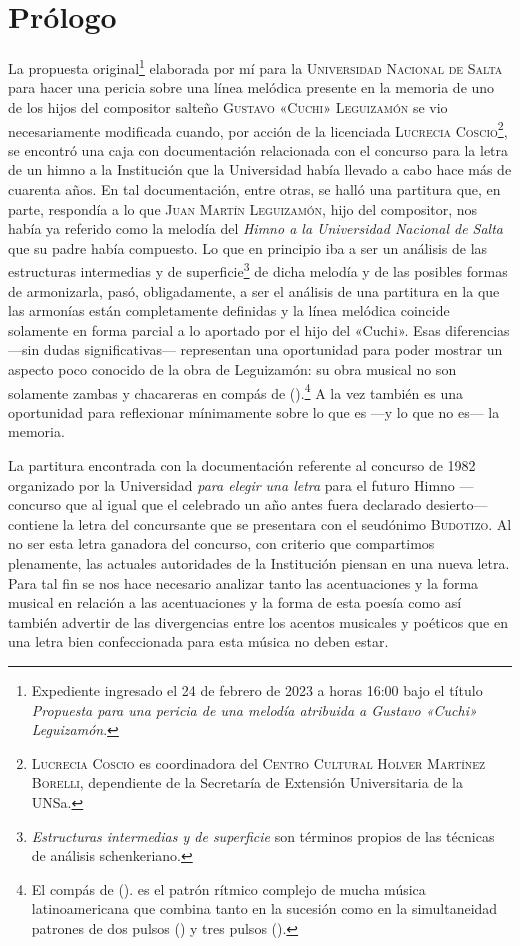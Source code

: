 \chapter{Prólogo}
\label{cap:prologo}

La propuesta original\footnote{Expediente ingresado el 24 de febrero de 2023 a horas 16:00 bajo el título \emph{Propuesta para una pericia de una melodía atribuida a Gustavo «Cuchi» Leguizamón}.} elaborada por mí para la \textsc{Universidad Nacional de Salta} para hacer una pericia sobre una línea melódica presente en la memoria de uno de los hijos del compositor salteño \textsc{Gustavo «Cuchi» Leguizamón} se vio necesariamente modificada cuando, por acción de la licenciada \textsc{Lucrecia Coscio}\footnote{\textsc{Lucrecia Coscio} es coordinadora del \textsc{Centro Cultural Holver Martínez Borelli}, dependiente de la Secretaría de Extensión Universitaria de la UNSa. }, se encontró una caja con documentación relacionada con el concurso para la letra de un himno a la Institución que la Universidad había llevado a cabo hace más de cuarenta años. En tal documentación, entre otras, se halló una partitura que, en parte, respondía a lo que \textsc{Juan Martín Leguizamón}, hijo del compositor, nos había ya referido como la melodía del \emph{Himno a la Universidad Nacional de Salta} que su padre había compuesto. Lo que en principio iba a ser un análisis de las estructuras intermedias y de superficie\footnote{\emph{Estructuras intermedias y de superficie} son términos propios de las técnicas de análisis schenkeriano.} de dicha melodía y de las posibles formas de armonizarla, pasó, obligadamente, a ser el análisis de una partitura en la que las armonías están completamente definidas y la línea melódica coincide solamente en forma parcial a lo aportado por el hijo del «Cuchi». Esas diferencias ---sin dudas significativas--- representan una oportunidad para poder mostrar un aspecto poco conocido de la obra de Leguizamón: su obra musical no son solamente zambas y chacareras en compás de \hbox{().}\footnote{El compás de \hbox{().} es el patrón rítmico complejo de mucha música latinoamericana que combina tanto en la sucesión como en la simultaneidad patrones de dos pulsos () y tres pulsos ().} A la vez también es una oportunidad para reflexionar mínimamente sobre lo que es ---y lo que no es--- la memoria.

La partitura encontrada con la documentación referente al concurso de 1982 organizado por la Universidad \emph{para elegir una letra} para el futuro Himno ---concurso que al igual que el celebrado un año antes fuera declarado desierto--- contiene la letra del concursante que se presentara con el seudónimo \textsc{Budotizo}. Al no ser esta letra ganadora del concurso, con criterio que compartimos plenamente, las actuales autoridades de la Institución piensan en una nueva letra. Para tal fin se nos hace necesario analizar tanto las acentuaciones y la forma musical en relación a las acentuaciones y la forma de esta poesía como así también advertir de las divergencias entre los acentos musicales y poéticos que en una letra bien confeccionada para esta música no deben estar.

